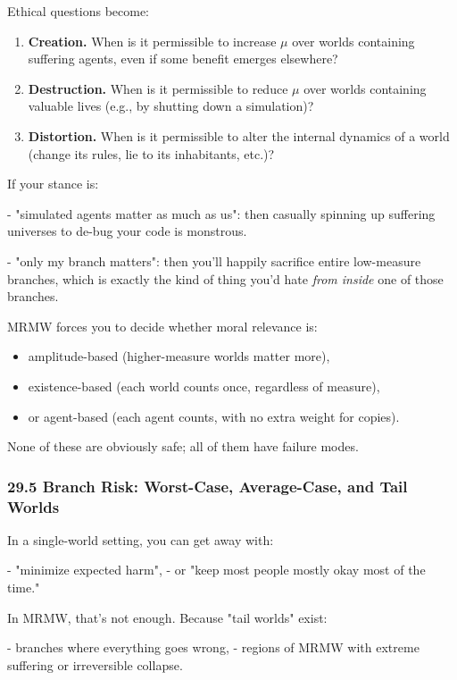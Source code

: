 Ethical questions become:

\begin{enumerate}
  \item \textbf{Creation.} When is it permissible to increase $\mu$ over worlds containing suffering agents, even if some benefit emerges elsewhere?

  \item \textbf{Destruction.} When is it permissible to reduce $\mu$ over worlds containing valuable lives (e.g., by shutting down a simulation)?

  \item \textbf{Distortion.} When is it permissible to alter the internal dynamics of a world (change its rules, lie to its inhabitants, etc.)?
\end{enumerate}

If your stance is:

- "simulated agents matter as much as us": then casually spinning up suffering universes to de-bug your code is monstrous.

- "only my branch matters": then you’ll happily sacrifice entire low-measure branches,
  which is exactly the kind of thing you’d hate \emph{from inside} one of those branches.

MRMW forces you to decide whether moral relevance is:

\begin{itemize}
  \item amplitude-based (higher-measure worlds matter more),
  \item existence-based (each world counts once, regardless of measure),
  \item or agent-based (each agent counts, with no extra weight for copies).
\end{itemize}

None of these are obviously safe; all of them have failure modes.

\subsubsection*{29.5  Branch Risk: Worst-Case, Average-Case, and Tail Worlds}

In a single-world setting, you can get away with:

- "minimize expected harm",
- or "keep most people mostly okay most of the time."

In MRMW, that’s not enough. Because "tail worlds" exist:

- branches where everything goes wrong,
- regions of MRMW with extreme suffering or irreversible collapse.

